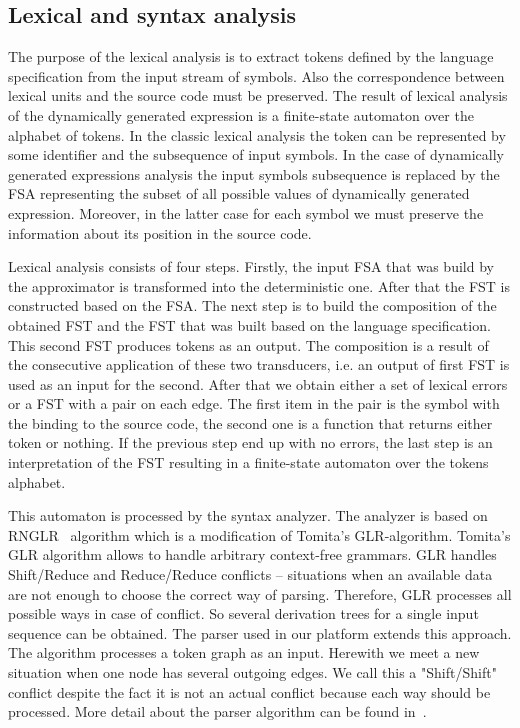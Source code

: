 \subsection{Lexical and syntax analysis}

The purpose of the lexical analysis is to extract tokens defined by the language specification from the input stream of symbols. Also the correspondence between lexical units and the source code must be preserved. The result of lexical analysis of the dynamically generated expression is a finite-state automaton over the alphabet of tokens. In the classic lexical analysis the token can be represented by some identifier and the subsequence of input symbols. In the case of dynamically generated expressions analysis the input symbols subsequence is replaced by the FSA representing the subset of all possible values of dynamically generated expression. Moreover, in the latter case for each symbol we must preserve the information about its position in the source code.

Lexical analysis consists of four steps. Firstly, the input FSA that was build by the approximator is transformed into the deterministic one. After that the FST is constructed based on the FSA. The next step is to build the composition of the obtained FST and the FST that was built based on the language specification. This second FST produces tokens as an output. The composition is a result of the consecutive application of these two transducers, i.e. an output of first FST is used as an input for the second. After that we obtain either a set of lexical errors or a FST with a pair on each edge. The first item in the pair is the symbol with the binding to the source code, the second one is a function that returns either token or nothing. If the previous step end up with no errors, the last step is an interpretation of the FST resulting in a finite-state automaton over the tokens alphabet.

This automaton is processed by the syntax analyzer. The analyzer is based on RNGLR~\cite{RNGLR:ref} algorithm which is a modification of Tomita's GLR-algorithm\cite{Tomita:ref}. Tomita's GLR algorithm allows to handle arbitrary context-free grammars. GLR handles Shift/Reduce and Reduce/Reduce conflicts -- situations when an available data are not enough to choose the correct way of parsing. Therefore, GLR processes all possible ways in case of conflict. So several derivation trees for a single input sequence can be obtained. The parser used in our platform extends this approach. The algorithm processes a token graph as an input. Herewith we meet a new situation when one node has several outgoing edges. We call this a "Shift/Shift" conflict despite the fact it is not an actual conflict because each way should be processed. More detail about the parser algorithm can be found in~\cite{AGLR:ref}. 